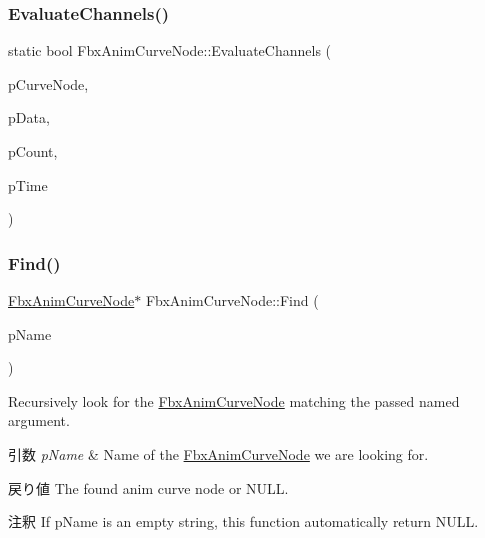 \subsubsection{\texorpdfstring{Evaluate\+Channels()}{EvaluateChannels()}}
{\footnotesize\ttfamily static bool Fbx\+Anim\+Curve\+Node\+::\+Evaluate\+Channels (\begin{DoxyParamCaption}\item[{\hyperlink{class_fbx_anim_curve_node}{Fbx\+Anim\+Curve\+Node} $\ast$}]{p\+Curve\+Node,  }\item[{double $\ast$}]{p\+Data,  }\item[{unsigned int}]{p\+Count,  }\item[{\hyperlink{class_fbx_time}{Fbx\+Time}}]{p\+Time }\end{DoxyParamCaption})\hspace{0.3cm}{\ttfamily [static]}}

\mbox{\label{class_fbx_anim_curve_node_aca6ee712b7eeafb1d00f42117520bac4}} 
\subsubsection{\texorpdfstring{Find()}{Find()}\hspace{0.1cm}{\footnotesize\ttfamily [1/2]}}
{\footnotesize\ttfamily \hyperlink{class_fbx_anim_curve_node}{Fbx\+Anim\+Curve\+Node}$\ast$ Fbx\+Anim\+Curve\+Node\+::\+Find (\begin{DoxyParamCaption}\item[{const char $\ast$}]{p\+Name }\end{DoxyParamCaption})}

Recursively look for the \hyperlink{class_fbx_anim_curve_node}{Fbx\+Anim\+Curve\+Node} matching the passed named argument. 
\begin{DoxyParams}{引数}
{\em p\+Name} & Name of the \hyperlink{class_fbx_anim_curve_node}{Fbx\+Anim\+Curve\+Node} we are looking for. \\
\hline
\end{DoxyParams}
\begin{DoxyReturn}{戻り値}
The found anim curve node or N\+U\+LL. 
\end{DoxyReturn}
\begin{DoxyRemark}{注釈}
If p\+Name is an empty string, this function automatically return N\+U\+LL. 
\end{DoxyRemark}
\mbox{\label{class_fbx_anim_curve_node_aa60f953e94636bb23a94860f60cc63e1}} 
